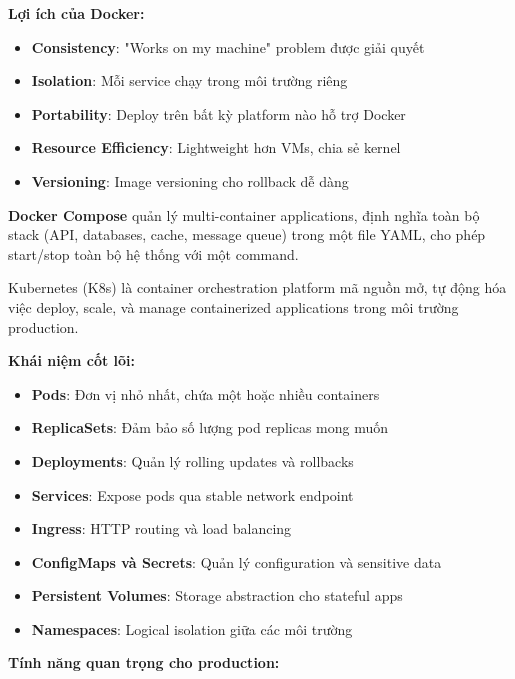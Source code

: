 \textbf{Lợi ích của Docker:}

\begin{itemize}
    \item \textbf{Consistency}: "Works on my machine" problem được giải quyết
    \item \textbf{Isolation}: Mỗi service chạy trong môi trường riêng
    \item \textbf{Portability}: Deploy trên bất kỳ platform nào hỗ trợ Docker
    \item \textbf{Resource Efficiency}: Lightweight hơn VMs, chia sẻ kernel
    \item \textbf{Versioning}: Image versioning cho rollback dễ dàng
\end{itemize}

\textbf{Docker Compose} quản lý multi-container applications, định nghĩa toàn bộ stack (API, databases, cache, message queue) trong một file YAML, cho phép start/stop toàn bộ hệ thống với một command.


Kubernetes (K8s) là container orchestration platform mã nguồn mở, tự động hóa việc deploy, scale, và manage containerized applications trong môi trường production.

\textbf{Khái niệm cốt lõi:}

\begin{itemize}
    \item \textbf{Pods}: Đơn vị nhỏ nhất, chứa một hoặc nhiều containers
    \item \textbf{ReplicaSets}: Đảm bảo số lượng pod replicas mong muốn
    \item \textbf{Deployments}: Quản lý rolling updates và rollbacks
    \item \textbf{Services}: Expose pods qua stable network endpoint
    \item \textbf{Ingress}: HTTP routing và load balancing
    \item \textbf{ConfigMaps và Secrets}: Quản lý configuration và sensitive data
    \item \textbf{Persistent Volumes}: Storage abstraction cho stateful apps
    \item \textbf{Namespaces}: Logical isolation giữa các môi trường
\end{itemize}

\textbf{Tính năng quan trọng cho production:}


